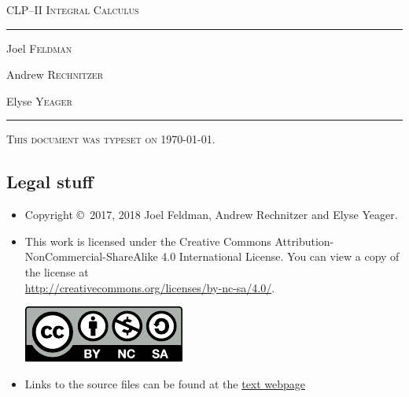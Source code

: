 \documentclass[12pt,letterpaper, openany]{book}
\begin{document}
\setcounter{page}{0}

\begin{titlepage}
\begin{center}
\textsc{\LARGE
CLP--II Integral Calculus
}\\[2ex]

\vspace{5ex}
\hrule
\vspace{5ex}

\begin{minipage}[t]{0.3\textwidth} \begin{flushleft}
\large Joel \textsc{Feldman}
\end{flushleft} \end{minipage}%
\begin{minipage}[t]{0.3\textwidth} \begin{flushleft}
\large Andrew \textsc{Rechnitzer}
\end{flushleft} \end{minipage}%
\begin{minipage}[t]{0.3\textwidth} \begin{flushright}
\large Elyse \textsc{Yeager}
\end{flushright} \end{minipage}%
\end{center}
\vspace{2ex}
\hrule

\vfill
\textsc{This document was typeset on \today.}
\end{titlepage}

\subsection*{Legal stuff}
\begin{itemize}
 \item Copyright \copyright\ 2017, 2018 Joel Feldman, Andrew Rechnitzer and Elyse Yeager.
\item This work is licensed under the
Creative Commons Attribution-NonCommercial-ShareAlike 4.0 International
License. You can view a copy of the license at \\
\url{http://creativecommons.org/licenses/by-nc-sa/4.0/}.
\begin{center}
 \includegraphics{by-nc-sa.pdf}
\end{center}
\item Links to the source files can be found at the \href{http://www.math.ubc.ca/~CLP/index.html}{text webpage}
\end{itemize}


\frontmatter


\tableofcontents

\mainmatter




\appendix



\end{document}
